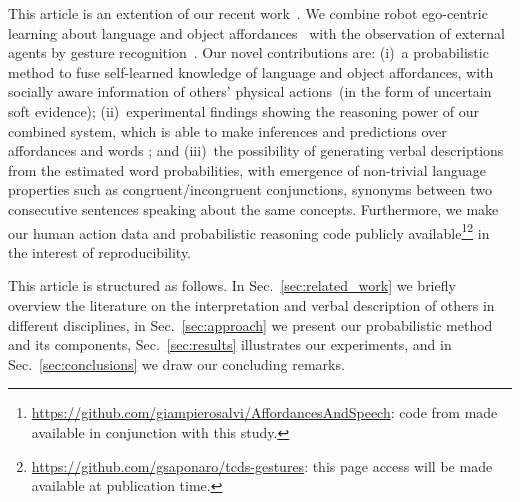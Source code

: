 This article is an extention of our recent work~\cite{saponaro:2017:glu}.
We combine robot ego-centric learning about language and object affordances~\cite{salvi:2012:smcb} with the observation of external agents by gesture recognition~\cite{saponaro:2013:crhri}.
Our novel contributions are:
(i)~a probabilistic method to fuse self-learned knowledge of language and object affordances, with socially aware information of others' physical actions~(in the form of uncertain soft evidence);
(ii)~experimental findings showing the reasoning power of our combined system, which is able to make inferences and predictions over affordances and words%
; and
(iii)~the possibility of generating verbal descriptions from the estimated word probabilities, with emergence of non-trivial language properties such as congruent/incongruent conjunctions, synonyms between two consecutive sentences speaking about the same concepts.
Furthermore, we make our human action data and probabilistic reasoning code publicly available\footnote{\url{https://github.com/giampierosalvi/AffordancesAndSpeech}: code from \cite{salvi:2012:smcb} made available in conjunction with this study.}\footnote{\url{https://github.com/gsaponaro/tcds-gestures}: this page access will be made available at publication time.} in the interest of reproducibility.

This article is structured as follows.
In Sec.~\ref{sec:related_work} we briefly overview the literature on the interpretation and verbal description of others in different disciplines,
in Sec.~\ref{sec:approach} we present our probabilistic method and its components,
Sec.~\ref{sec:results} illustrates our experiments, and
in Sec.~\ref{sec:conclusions} we draw our concluding remarks.

